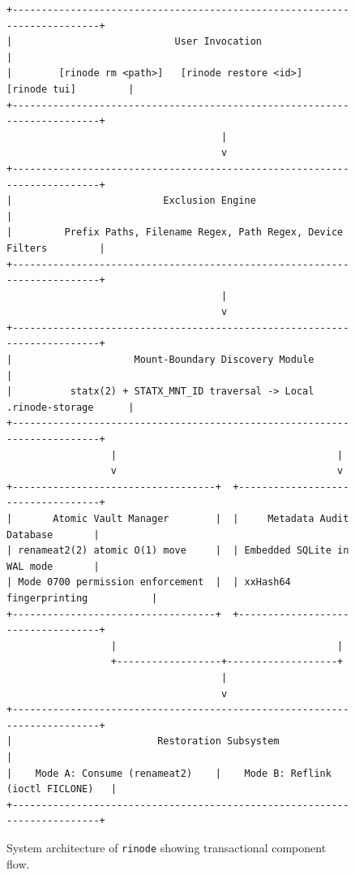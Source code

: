 \documentclass[11pt,a4paper]{article}
\begin{document}
\begin{figure}[h]
\centering
\begin{verbatim}
+--------------------------------------------------------------------------+
|                            User Invocation                               |
|        [rinode rm <path>]   [rinode restore <id>]   [rinode tui]         |
+--------------------------------------------------------------------------+
                                     |
                                     v
+--------------------------------------------------------------------------+
|                          Exclusion Engine                                |
|         Prefix Paths, Filename Regex, Path Regex, Device Filters         |
+--------------------------------------------------------------------------+
                                     |
                                     v
+--------------------------------------------------------------------------+
|                     Mount-Boundary Discovery Module                      |
|          statx(2) + STATX_MNT_ID traversal -> Local .rinode-storage      |
+--------------------------------------------------------------------------+
                  |                                      |
                  v                                      v
+-----------------------------------+  +-----------------------------------+
|       Atomic Vault Manager        |  |     Metadata Audit Database       |
| renameat2(2) atomic O(1) move     |  | Embedded SQLite in WAL mode       |
| Mode 0700 permission enforcement  |  | xxHash64 fingerprinting           |
+-----------------------------------+  +-----------------------------------+
                  |                                      |
                  +------------------+-------------------+
                                     |
                                     v
+--------------------------------------------------------------------------+
|                         Restoration Subsystem                            |
|    Mode A: Consume (renameat2)    |    Mode B: Reflink (ioctl FICLONE)   |
+--------------------------------------------------------------------------+
\end{verbatim}
\caption{System architecture of \texttt{rinode} showing transactional component flow.}
\label{fig:arch}
\end{figure}
\end{document}
